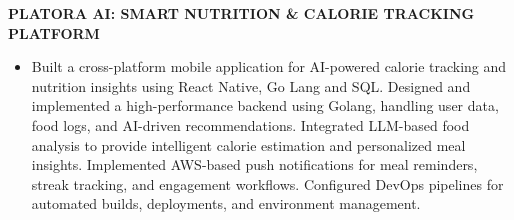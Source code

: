 \documentclass[letterpaper,10pt]{article}
\newcommand{\runsubsection}[1]{
  \color{subheadings}\fontsize{11pt}{13pt}\selectfont\bfseries\uppercase{#1}\normalfont
}
\newcommand{\descript}[1]{
  \color{subheadings}\raggedright\scshape\fontsize{10pt}{12pt}\selectfont{#1\\}\normalfont
}
\newenvironment{tightitemize}{
  \vspace{2pt}\begin{itemize}[leftmargin=12pt]\itemsep1pt \parskip0pt \parsep0pt
}{
  \end{itemize}\vspace{-\topsep}
}
\newcommand{\sectionsep}{\vspace{6pt}}
\begin{document}
\begin{minipage}[t]{0.66\textwidth}
\runsubsection{Platora AI: Smart Nutrition \& Calorie Tracking Platform}

\descript{| React Native, Golang, SQL, AWS, LLMs, Push Notifications, DevOps}


\begin{tightitemize}
\item Built a cross-platform mobile application for AI-powered calorie tracking and nutrition insights using React Native, Go Lang and SQL. Designed and implemented a high-performance backend using Golang, handling user data, food logs, and AI-driven recommendations. Integrated LLM-based food analysis to provide intelligent calorie estimation and personalized meal insights. Implemented AWS-based push notifications for meal reminders, streak tracking, and engagement workflows. Configured DevOps pipelines for automated builds, deployments, and environment management.
\end{tightitemize}
\sectionsep



\end{minipage}
\end{document}
